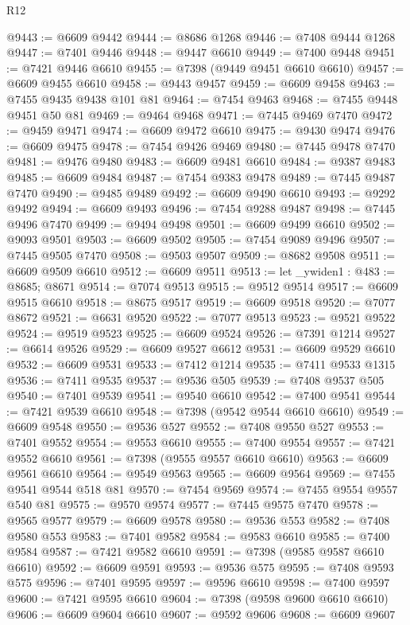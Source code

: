 \begin{lexlean}{R12}
\begin{coremodule}
@9443 := @6609 @9442
@9444 := @8686 @1268
@9446 := @7408 @9444 @1268
@9447 := @7401 @9446
@9448 := @9447 @6610
@9449 := @7400 @9448
@9451 := @7421 @9446 @6610
@9455 := @7398 (@9449 @9451 @6610 @6610)
@9457 := @6609 @9455 @6610
@9458 := @9443 @9457
@9459 := @6609 @9458
@9463 := @7455 @9435 @9438 @101 @81
@9464 := @7454 @9463
@9468 := @7455 @9448 @9451 @50 @81
@9469 := @9464 @9468
@9471 := @7445 @9469 @7470
@9472 := @9459 @9471
@9474 := @6609 @9472 @6610
@9475 := @9430 @9474
@9476 := @6609 @9475
@9478 := @7454 @9426 @9469
@9480 := @7445 @9478 @7470
@9481 := @9476 @9480
@9483 := @6609 @9481 @6610
@9484 := @9387 @9483
@9485 := @6609 @9484
@9487 := @7454 @9383 @9478
@9489 := @7445 @9487 @7470
@9490 := @9485 @9489
@9492 := @6609 @9490 @6610
@9493 := @9292 @9492
@9494 := @6609 @9493
@9496 := @7454 @9288 @9487
@9498 := @7445 @9496 @7470
@9499 := @9494 @9498
@9501 := @6609 @9499 @6610
@9502 := @9093 @9501
@9503 := @6609 @9502
@9505 := @7454 @9089 @9496
@9507 := @7445 @9505 @7470
@9508 := @9503 @9507
@9509 := @8682 @9508
@9511 := @6609 @9509 @6610
@9512 := @6609 @9511
@9513 := let _ywiden1 : @483 := @8685; @8671
@9514 := @7074 @9513
@9515 := @9512 @9514
@9517 := @6609 @9515 @6610
@9518 := @8675 @9517
@9519 := @6609 @9518
@9520 := @7077 @8672
@9521 := @6631 @9520
@9522 := @7077 @9513
@9523 := @9521 @9522
@9524 := @9519 @9523
@9525 := @6609 @9524
@9526 := @7391 @1214
@9527 := @6614 @9526
@9529 := @6609 @9527 @6612
@9531 := @6609 @9529 @6610
@9532 := @6609 @9531
@9533 := @7412 @1214
@9535 := @7411 @9533 @1315
@9536 := @7411 @9535
@9537 := @9536 @505
@9539 := @7408 @9537 @505
@9540 := @7401 @9539
@9541 := @9540 @6610
@9542 := @7400 @9541
@9544 := @7421 @9539 @6610
@9548 := @7398 (@9542 @9544 @6610 @6610)
@9549 := @6609 @9548
@9550 := @9536 @527
@9552 := @7408 @9550 @527
@9553 := @7401 @9552
@9554 := @9553 @6610
@9555 := @7400 @9554
@9557 := @7421 @9552 @6610
@9561 := @7398 (@9555 @9557 @6610 @6610)
@9563 := @6609 @9561 @6610
@9564 := @9549 @9563
@9565 := @6609 @9564
@9569 := @7455 @9541 @9544 @518 @81
@9570 := @7454 @9569
@9574 := @7455 @9554 @9557 @540 @81
@9575 := @9570 @9574
@9577 := @7445 @9575 @7470
@9578 := @9565 @9577
@9579 := @6609 @9578
@9580 := @9536 @553
@9582 := @7408 @9580 @553
@9583 := @7401 @9582
@9584 := @9583 @6610
@9585 := @7400 @9584
@9587 := @7421 @9582 @6610
@9591 := @7398 (@9585 @9587 @6610 @6610)
@9592 := @6609 @9591
@9593 := @9536 @575
@9595 := @7408 @9593 @575
@9596 := @7401 @9595
@9597 := @9596 @6610
@9598 := @7400 @9597
@9600 := @7421 @9595 @6610
@9604 := @7398 (@9598 @9600 @6610 @6610)
@9606 := @6609 @9604 @6610
@9607 := @9592 @9606
@9608 := @6609 @9607

\end{coremodule}
\end{lexlean}

